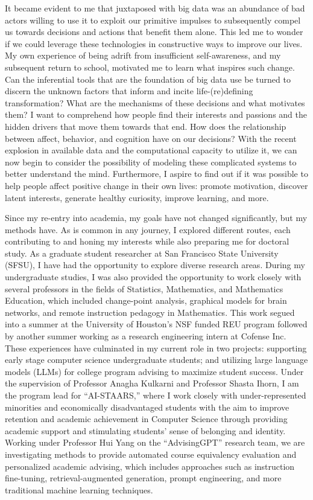 \documentclass[12pt]{article}
\begin{document}
It became evident to me that juxtaposed with big data was an abundance of bad actors willing to use it to exploit our primitive
impulses to subsequently compel us towards decisions and actions that benefit them alone. This led me to wonder if we could leverage these
technologies in constructive ways to improve our lives. My own experience of being adrift from insufficient self-awareness, and my subsequent
return to school, motivated me to learn what inspires such change. Can the inferential tools that are the foundation of big data use be
turned to discern the unknown factors that inform and incite life-(re)defining transformation?  What are the mechanisms of these decisions
and what motivates them?  I want to comprehend how people find their interests and passions and the hidden drivers that move them towards
that end. How does the relationship between affect, behavior, and cognition have on our decisions?  With the recent explosion in available
data and the computational capacity to utilize it, we can now begin to consider the possibility of modeling these complicated systems to
better understand the mind.  Furthermore, I aspire to find out if it was possible to help people affect positive change in their own lives:
promote motivation, discover latent interests, generate healthy curiosity, improve learning, and more.

Since my re-entry into academia, my goals have not changed significantly, but my methods have. As is common in any journey, I explored
different routes, each contributing to and honing my interests while also preparing me for doctoral study.  As a graduate student researcher
at San Francisco State University (SFSU), I have had the opportunity to explore diverse research areas. During my undergraduate studies, I
was also provided the opportunity to work closely with several professors in the fields of Statistics, Mathematics, and Mathematics
Education, which included change-point analysis, graphical models for brain networks, and remote instruction pedagogy in Mathematics.  This
work segued into a summer at the University of Houston's NSF funded REU program followed by another summer working as a research engineering
intern at Cofense Inc.  These experiences have culminated in my current role in two projects: supporting early stage computer science
undergraduate students; and utilizing large language models (LLMs) for college program advising to maximize student success.  Under the
supervision of Professor Anagha Kulkarni and Professor Shasta Ihorn, I am the program lead for ``AI-STAARS,'' where I work closely with
under-represented minorities and economically disadvantaged students with the aim to improve retention and academic achievement in Computer
Science through providing academic support and stimulating students' sense of belonging and identity.  Working under Professor Hui Yang on
the ``AdvisingGPT'' research team, we are investigating methods to provide automated course equivalency evaluation and personalized academic
advising, which includes approaches such as instruction fine-tuning, retrieval-augmented generation, prompt engineering, and more
traditional machine learning techniques.
\end{document}
